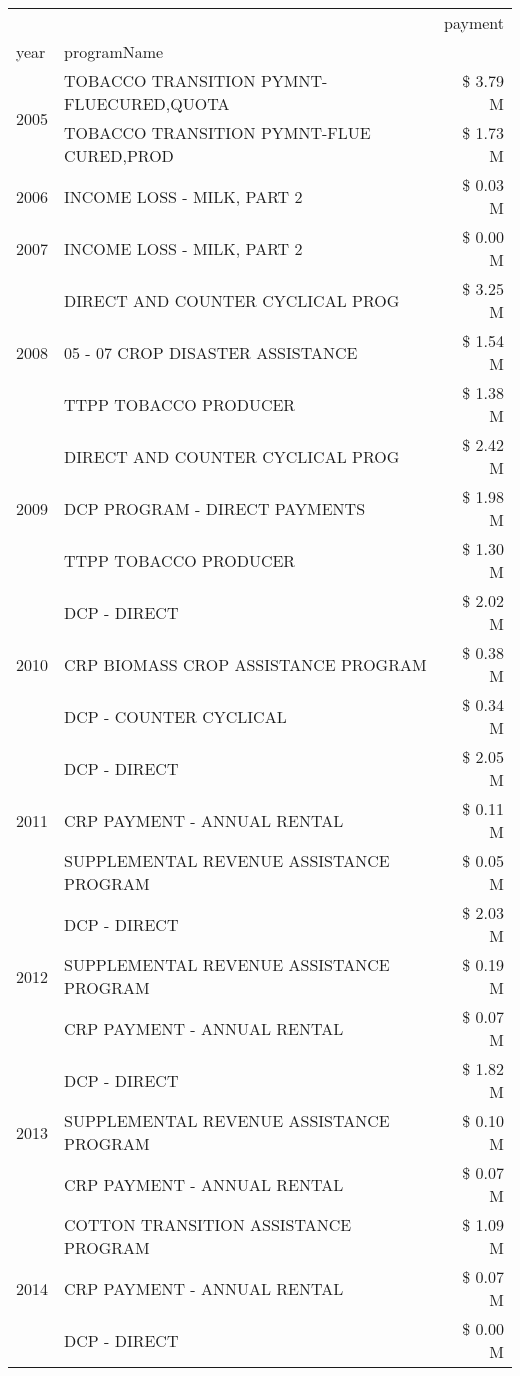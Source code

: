 \begin{tabular}{llr}
\toprule
 &  & payment \\
year & programName &  \\
\midrule
\multirow[t]{2}{*}{2005} & TOBACCO TRANSITION PYMNT-FLUECURED,QUOTA & \$ 3.79 M \\
 & TOBACCO TRANSITION PYMNT-FLUE CURED,PROD & \$ 1.73 M \\
\cline{1-3}
2006 & INCOME LOSS - MILK, PART 2 & \$ 0.03 M \\
\cline{1-3}
2007 & INCOME LOSS - MILK, PART 2 & \$ 0.00 M \\
\cline{1-3}
\multirow[t]{3}{*}{2008} & DIRECT AND COUNTER CYCLICAL PROG & \$ 3.25 M \\
 & 05 - 07 CROP DISASTER ASSISTANCE & \$ 1.54 M \\
 & TTPP TOBACCO PRODUCER & \$ 1.38 M \\
\cline{1-3}
\multirow[t]{3}{*}{2009} & DIRECT AND COUNTER CYCLICAL PROG & \$ 2.42 M \\
 & DCP PROGRAM - DIRECT PAYMENTS & \$ 1.98 M \\
 & TTPP TOBACCO PRODUCER & \$ 1.30 M \\
\cline{1-3}
\multirow[t]{3}{*}{2010} & DCP - DIRECT & \$ 2.02 M \\
 & CRP BIOMASS CROP ASSISTANCE PROGRAM & \$ 0.38 M \\
 & DCP - COUNTER CYCLICAL & \$ 0.34 M \\
\cline{1-3}
\multirow[t]{3}{*}{2011} & DCP - DIRECT & \$ 2.05 M \\
 & CRP PAYMENT - ANNUAL RENTAL & \$ 0.11 M \\
 & SUPPLEMENTAL REVENUE ASSISTANCE PROGRAM & \$ 0.05 M \\
\cline{1-3}
\multirow[t]{3}{*}{2012} & DCP - DIRECT & \$ 2.03 M \\
 & SUPPLEMENTAL REVENUE ASSISTANCE PROGRAM & \$ 0.19 M \\
 & CRP PAYMENT - ANNUAL RENTAL & \$ 0.07 M \\
\cline{1-3}
\multirow[t]{3}{*}{2013} & DCP - DIRECT & \$ 1.82 M \\
 & SUPPLEMENTAL REVENUE ASSISTANCE PROGRAM & \$ 0.10 M \\
 & CRP PAYMENT - ANNUAL RENTAL & \$ 0.07 M \\
\cline{1-3}
\multirow[t]{3}{*}{2014} & COTTON TRANSITION ASSISTANCE PROGRAM & \$ 1.09 M \\
 & CRP PAYMENT - ANNUAL RENTAL & \$ 0.07 M \\
 & DCP - DIRECT & \$ 0.00 M \\

\end{tabular}
